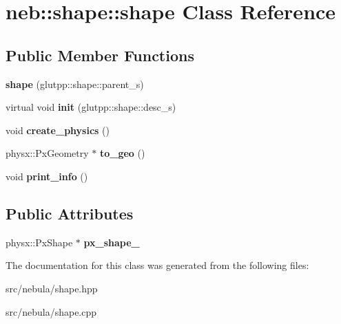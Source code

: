 \hypertarget{classneb_1_1shape_1_1shape}{
\section{neb::shape::shape Class Reference}
\label{classneb_1_1shape_1_1shape}
}
\subsection*{Public Member Functions}
\begin{DoxyCompactItemize}
\item 
\hypertarget{classneb_1_1shape_1_1shape_a99b6ce85fd11ae4c653af5d224eccf0e}{
{\bfseries shape} (glutpp::shape::parent\_\-s)}
\label{classneb_1_1shape_1_1shape_a99b6ce85fd11ae4c653af5d224eccf0e}

\item 
\hypertarget{classneb_1_1shape_1_1shape_a6b32b64391220f5b23eabe7f9c4af596}{
virtual void {\bfseries init} (glutpp::shape::desc\_\-s)}
\label{classneb_1_1shape_1_1shape_a6b32b64391220f5b23eabe7f9c4af596}

\item 
\hypertarget{classneb_1_1shape_1_1shape_af34910feff0944f03ce5a0cd7599f956}{
void {\bfseries create\_\-physics} ()}
\label{classneb_1_1shape_1_1shape_af34910feff0944f03ce5a0cd7599f956}

\item 
\hypertarget{classneb_1_1shape_1_1shape_a6c52cdce2b3575c73d9440fba5e6934e}{
physx::PxGeometry $\ast$ {\bfseries to\_\-geo} ()}
\label{classneb_1_1shape_1_1shape_a6c52cdce2b3575c73d9440fba5e6934e}

\item 
\hypertarget{classneb_1_1shape_1_1shape_ae89b01dc51c8d11d478c4377d5cea38c}{
void {\bfseries print\_\-info} ()}
\label{classneb_1_1shape_1_1shape_ae89b01dc51c8d11d478c4377d5cea38c}

\end{DoxyCompactItemize}
\subsection*{Public Attributes}
\begin{DoxyCompactItemize}
\item 
\hypertarget{classneb_1_1shape_1_1shape_aede64cf428691b049d68c5f62fd22383}{
physx::PxShape $\ast$ {\bfseries px\_\-shape\_\-}}
\label{classneb_1_1shape_1_1shape_aede64cf428691b049d68c5f62fd22383}

\end{DoxyCompactItemize}


The documentation for this class was generated from the following files:\begin{DoxyCompactItemize}
\item 
src/nebula/shape.hpp\item 
src/nebula/shape.cpp\end{DoxyCompactItemize}
